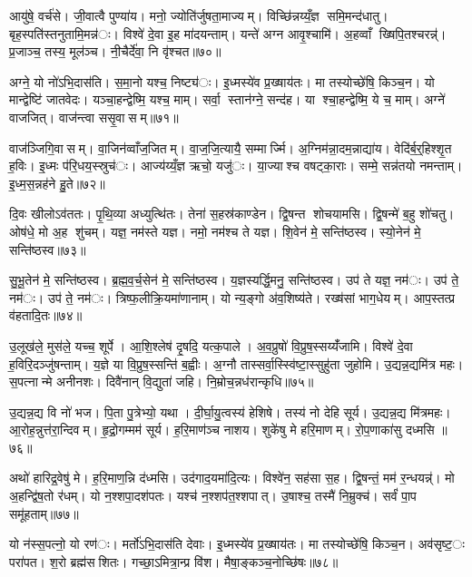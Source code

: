 आयु॑षे॒ वर्च॑से। जी॒वात्वै पुण्या॑य। मनो॒ ज्योति॑र्जुषता॒माज्यम्। विच्छि॑न्नय्यँ॒ज्ञ समि॒मन्द॑धातु। बृह॒स्पति॑स्तनुतामि॒मन्न॑ः। विश्वे॑ दे॒वा इ॒ह मा॑दयन्ताम्। यन्ते॑ अग्न आवृ॒श्चामि॑। अ॒हव्वाँ ख्षिपि॒तश्चरन्न्॑। प्र॒जाञ्च॒ तस्य॒ मूल॑ञ्च। नी॒चैर्दे॑वा॒ नि वृ॑श्चत॥७०॥

अग्ने॒ यो नो॑ऽभि॒दास॑ति। स॒मा॒नो यश्च॒ निष्ट्य॑ः। इ॒ध्मस्ये॑व प्र॒ख्षाय॑तः। मा तस्योच्छे॑षि॒ किञ्च॒न। यो मान्द्वेष्टि॑ जातवेदः। यञ्चा॒हन्द्वेष्मि॒ यश्च॒ माम्। सर्वा॒ स्तान॑ग्ने॒ सन्द॑ह। या श्चा॒हन्द्वेष्मि॒ ये च॒ माम्। अग्ने॑ वाजजित्। वाज॑न्त्वा ससृ॒वासम्॥७१॥

वाज॑ञ्जिगि॒वासम्। वा॒जिन॑व्वाँज॒जितम्। वा॒ज॒जि॒त्यायै॒ सम्मार्ज्मि। अ॒ग्निम॑न्ना॒दम॒न्नाद्या॑य। वेदि॑र्ब॒र्॒हिश्शृ॒त ह॒विः। इ॒ध्मः प॑रि॒धय॒स्स्रुच॑ः। आज्य॑य्यँ॒ज्ञ ऋचो॒ यजु॑ः। या॒ज्याश्च वषट्का॒राः। सम्मे॒ सन्न॑तयो नमन्ताम्। इ॒ध्म॒स॒न्नह॑ने हु॒ते॥७२॥

दि॒वः खीलोऽव॑ततः। पृ॒थि॒व्या अध्युत्थि॑तः। तेना॑ स॒हस्र॑काण्डेन। द्वि॒षन्त शोचयामसि। द्वि॒षन्मे॑ ब॒हु शो॑चतु। ओष॑धे॒ मो अ॒ह शु॑चम्। यज्ञ॒ नम॑स्ते यज्ञ। नमो॒ नम॑श्च ते यज्ञ। शि॒वेन॑ मे॒ सन्ति॑ष्ठस्व। स्यो॒नेन॑ मे॒ सन्ति॑ष्ठस्व॥७३॥

सु॒भू॒तेन॑ मे॒ सन्ति॑ष्ठस्व। ब्र॒ह्म॒व॒र्च॒सेन॑ मे॒ सन्ति॑ष्ठस्व। य॒ज्ञस्यर्द्धि॒मनु॒ सन्ति॑ष्ठस्व। उप॑ ते यज्ञ॒ नम॑ः। उप॑ ते॒ नम॑ः। उप॑ ते॒ नम॑ः। त्रिष्फ॒लीक्रि॒यमा॑णानाम्। यो न्य॒ङ्गो अ॑व॒शिष्य॑ते। रख्ष॑सां भाग॒धेयम्। आप॒स्तत्प्र व॑हतादि॒तः॥७४॥

उ॒लूख॑ले॒ मुस॑ले॒ यच्च॒ शूर्पे। आ॒शि॒श्लेष॑ दृ॒षदि॒ यत्क॒पाले। अ॒व॒प्रुषो॑ वि॒प्रुष॒स्सय्यँ॑जामि। विश्वे॑ दे॒वा ह॒विरि॒दञ्जु॑षन्ताम्। य॒ज्ञे या वि॒प्रुष॒स्सन्ति॑ ब॒ह्वीः। अ॒ग्नौ तास्सर्वा॒स्स्वि॑ष्टा॒स्सुहु॑ता जुहोमि। उ॒द्यन्न॒द्यमि॑त्र महः। स॒पत्नान्मे अनीनशः। दिवै॑नान् वि॒द्युता॑ जहि। नि॒म्रोच॒न्नध॑रान्कृधि॥७५॥

उ॒द्यन्न॒द्य वि नो॑ भज। पि॒ता पु॒त्रेभ्यो॒ यथा। दी॒र्घा॒यु॒त्वस्य॑ हेशिषे। तस्य॑ नो देहि सूर्य। उ॒द्यन्न॒द्य मि॑त्रमहः। आ॒रोह॒न्नुत्त॑रा॒न्दिवम्। हृ॒द्रो॒गम्मम॑ सूर्य। ह॒रि॒माण॑ञ्च नाशय। शुके॑षु मे हरि॒माणम्। रो॒प॒णाका॑सु दध्मसि ॥७६॥

अथो॑ हारिद्र॒वेषु॑ मे। ह॒रि॒माण॒न्नि द॑ध्मसि। उद॑गाद॒यमा॑दि॒त्यः। विश्वे॑न॒ सह॑सा स॒ह। द्वि॒षन्तं॒ मम॑ र॒न्धयन्न्॑। मो अ॒हन्द्वि॑ष॒तो र॑धम्। यो न॒श्शपा॒दश॑पतः। यश्च॑ न॒श्शप॑त॒श्शपात्। उ॒षाश्च॒ तस्मै॑ नि॒म्रुक्च॑। सर्वं॑ पा॒प समू॑हताम्॥७७॥

यो न॑स्स॒पत्नो॒ यो रण॑ः। मर्तो॑ऽभि॒दास॑ति देवाः। इ॒ध्मस्ये॑व प्र॒ख्षाय॑तः। मा तस्योच्छे॑षि॒ किञ्च॒न। अव॑सृष्ट॒ः परा॑पत। श॒रो ब्रह्म॑सशितः। गच्छा॒ऽमित्रा॒न्प्र वि॑श। मैषा॒ङ्कञ्च॒नोच्छि॑षः॥७८॥

